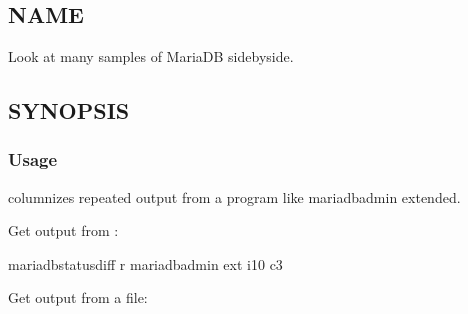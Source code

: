 \documentclass[letterpaper,10pt,english]{sphinxmanual}
\begin{document}
\chapter{}
\label{\detokenize{mariadb-status-diff:mariadb-status-diff}}\label{\detokenize{mariadb-status-diff::doc}}

\section{NAME}
\label{\detokenize{mariadb-status-diff:name}}
\sphinxAtStartPar
{} \sphinxhyphen{} Look at many samples of MariaDB  side\sphinxhyphen{}by\sphinxhyphen{}side.


\section{SYNOPSIS}
\label{\detokenize{mariadb-status-diff:synopsis}}

\subsection{Usage}
\label{\detokenize{mariadb-status-diff:usage}}
\begin{sphinxVerbatim}[commandchars=\\\{\}]
 \PYG{p}{[}\PYG{p}{]}  
\end{sphinxVerbatim}

\sphinxAtStartPar
{} columnizes repeated output from a program like mariadb\sphinxhyphen{}admin extended.

\sphinxAtStartPar
Get output from :

\begin{sphinxVerbatim}[commandchars=\\\{\}]
mariadb\PYGZhy{}status\PYGZhy{}diff \PYGZhy{}r \PYGZhy{}\PYGZhy{} mariadb\PYGZhy{}admin ext \PYGZhy{}i10 \PYGZhy{}c3
\end{sphinxVerbatim}

\sphinxAtStartPar
Get output from a file:
\end{document}
